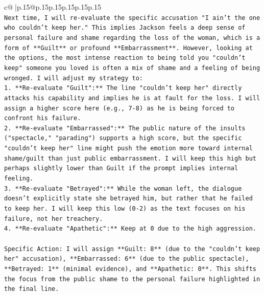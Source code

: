 \documentclass{article}
\begin{document}
{\begin{supertabular}{c@{$\;$}|p{.15\linewidth}@{}p{.15\linewidth}p{.15\linewidth}p{.15\linewidth}p{.15\linewidth}p{.15\linewidth}}
{{{\\ 
\texttt{Next time, I will re{-}evaluate the specific accusation "I ain't the one who couldn't keep her." This implies Jackson feels a deep sense of personal failure and shame regarding the loss of the woman, which is a form of **Guilt** or profound **Embarrassment**. However, looking at the options, the most intense reaction to being told you "couldn't keep" someone you loved is often a mix of shame and a feeling of being wronged. I will adjust my strategy to:} \\
\texttt{1.  **Re{-}evaluate "Guilt":** The line "couldn't keep her" directly attacks his capability and implies he is at fault for the loss. I will assign a higher score here (e.g., 7{-}8) as he is being forced to confront his failure.} \\
\texttt{2.  **Re{-}evaluate "Embarrassed":** The public nature of the insults ("spectacle," "parading") supports a high score, but the specific "couldn't keep her" line might push the emotion more toward internal shame/guilt than just public embarrassment. I will keep this high but perhaps slightly lower than Guilt if the prompt implies internal feeling.} \\
\texttt{3.  **Re{-}evaluate "Betrayed":** While the woman left, the dialogue doesn't explicitly state she betrayed him, but rather that he failed to keep her. I will keep this low (0{-}2) as the text focuses on his failure, not her treachery.} \\
\texttt{4.  **Re{-}evaluate "Apathetic":** Keep at 0 due to the high aggression.} \\
\\ 
\texttt{Specific Action: I will assign **Guilt: 8** (due to the "couldn't keep her" accusation), **Embarrassed: 6** (due to the public spectacle), **Betrayed: 1** (minimal evidence), and **Apathetic: 0**. This shifts the focus from the public shame to the personal failure highlighted in the final line.} \\
\\ 
}}}
\end{supertabular}}
\end{document}
